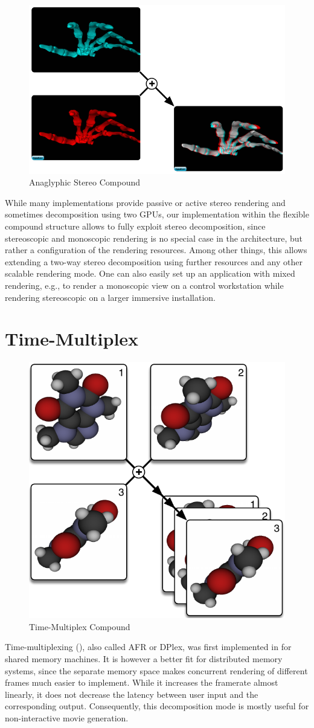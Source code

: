 \begin{figure}
 \includegraphics[width=.618\textwidth]{images/Stereo}
 {\caption{\label{fStereo}Anaglyphic Stereo Compound}}
\end{figure}

While many implementations provide passive or active stereo rendering and
sometimes decomposition using two GPUs, our implementation within the flexible
compound structure allows to fully exploit stereo decomposition, since
stereoscopic and monoscopic rendering is no special case in the architecture,
but rather a configuration of the rendering resources. Among other things, this
allows extending a two-way stereo decomposition using further resources and any
other scalable rendering mode. One can also easily set up an application with
mixed rendering, e.g., to render a monoscopic view on a control workstation
while rendering stereoscopic on a larger immersive installation.


\section{Time-Multiplex}

\begin{figure}
\includegraphics[width=.382\textwidth]{images/DPlex}
{\caption{\label{fDPlex}Time-Multiplex Compound}} \end{figure}
Time-multiplexing (), also called AFR or DPlex, was first
implemented in \cite{BRE:05} for shared memory machines. It is however a better
fit for distributed memory systems, since the separate memory space makes
concurrent rendering of different frames much easier to implement. While it
increases the framerate almost linearly, it does not decrease the latency
between user input and the corresponding output. Consequently, this
decomposition mode is mostly useful for non-interactive movie generation.

